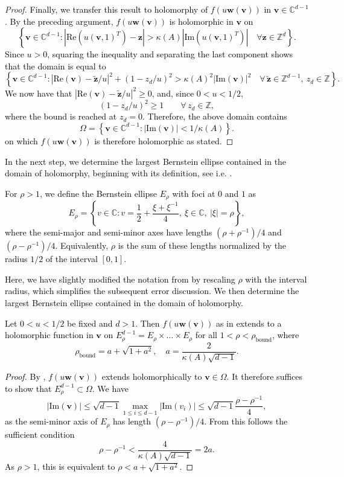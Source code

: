 \documentclass[]{amsart}
\numberwithin{mythm}{section}
\renewcommand{\Re}[1]{\mathrm{Re}(#1)}
\renewcommand{\Im}[1]{\mathrm{Im}(#1)}
\newcommand{\new}[1]{{\textcolor{black}{#1}}}
\begin{document}
\begin{proof}
\new{Finally, we transfer this result to holomorphy of $f(u\bm w(\bm v))$ in $\bm v\in\mathds C^{d-1}$. By the preceding argument, $f(u\bm w(\bm v))$ is holomorphic in $\bm v$ on
\[
\left\{
\bm v\in\mathds C^{d-1}:
\left|\Re{u(\bm v,1)^T}-\bm z\right|
>
\kappa(A)\left|\Im{u(\bm v,1)^T}\right|
\quad \forall \bm z\in\mathds Z^d
\right\}.
\]
Since $u>0$, squaring the inequality and separating the last component shows that the domain is equal to
\[
\left\{
\bm v\in\mathds C^{d-1}:
\left|\Re{\bm v}-\tilde{\bm z}/u\right|^2
+
\left(1-z_d/u\right)^2
>
\kappa(A)^2 |\Im{\bm v}|^2
\quad
\forall\, \tilde{\bm z}\in\mathds Z^{d-1},\ z_d\in\mathds Z
\right\}.
\]
We now have that $\left|\Re{\bm v}-\tilde{\bm z}/{u}\right|^2 \ge 0$,
and, since $0<u<1/2$,
\[
\left(1-z_d/u\right)^2 \ge 1
\qquad \forall\, z_d\in\mathds Z,
\]
where the bound is reached at $z_d=0$.
Therefore, the above domain contains
\[
\Omega=\left\{
\bm v\in\mathds C^{d-1}:
|\Im{\bm v}|<1/\kappa(A)
\right\}.
\]
on which $f(u\bm w(\bm v))$ is therefore holomorphic as stated.}
\end{proof}
\new{In the next step, we determine the largest Bernstein ellipse contained in the domain of holomorphy, beginning with its definition, see i.e. \cite[Chap.~5.3.2.2]{sauter2010boundary}.}%
%
\new{\begin{definition}
For $\rho>1$, we define the Bernstein ellipse $E_\rho$ with foci at $0$ and $1$ as
\[
E_{\rho}
=
\left\{
v\in\mathbb{C} :
v=\frac12+\frac{\xi+\xi^{-1}}{4},
\ \xi\in\mathbb{C},\ |\xi|=\rho
\right\},
\]
where the semi-major and semi-minor axes have lengths $(\rho+\rho^{-1})/4$ and $(\rho-\rho^{-1})/4$. Equivalently, $\rho$ is the sum of these lengths normalized by the radius $1/2$ of the interval $[0,1]$.
\end{definition}}%
\new{Here, we have slightly modified the notation from \cite{sauter2010boundary} by rescaling $\rho$ with the interval radius, which simplifies the subsequent error discussion. We then determine the largest Bernstein ellipse contained in the domain of holomorphy.}
\new{\begin{corollary}
\label{hol-bernstein}
Let $0<u<1/2$ be fixed and $d>1$.
Then
$f(u\bm w(\bm v))$ as in \Cref{duffy} extends to a holomorphic function in $\bm v$ on
$E_{\rho}^{d-1}=E_{\rho}\times\ldots\times E_{\rho}$
for all $1<\rho<\rho_\mathrm{bound}$,
where
\[
\rho_\mathrm{bound}=a+\sqrt{1+a^2},\quad a=\frac{2}{\kappa(A)\sqrt{d-1}}.
\]
\end{corollary}
\begin{proof}
By \Cref{hol-integrand}, $f(u \bm w(\bm v))$ extends holomorphically to $\bm v\in \Omega$. It therefore suffices to show that $E_\rho^{d-1}\subset \Omega$. We have 
\[
\vert \Im{\bm v}\vert \le \sqrt{d-1} \max_{1\le i\le d-1 } \vert \Im{v_i}\vert \le  \sqrt{d-1} \frac{\rho-\rho^{-1}}{4},
\]
as the semi-minor axis of $E_\rho$ has length $(\rho-\rho^{-1})/4$. From this follows the sufficient condition
\[
\rho-\rho^{-1} < \frac{4}{\kappa(A)\sqrt{d-1}}=2a.
\]
As $\rho>1$, this is equivalent to $\rho<a+\sqrt{1+a^2}$.
\end{proof}}
\end{document}
